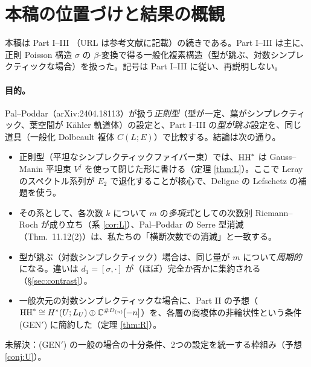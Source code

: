 \section{本稿の位置づけと結果の概観}\label{sec:intro}
本稿は Part I--III \cite{PartI,PartII,PartIII}（URL は参考文献に記載）の続きである。Part I--III は主に、正則 Poisson 構造 $\sigma$ の $\beta$-変換で得る一般化複素構造（型が跳ぶ、対数シンプレクティックな場合）を扱った。記号は Part I--III に従い、再説明しない。

\paragraph{目的。}
Pal--Poddar（arXiv:2404.18113）が扱う\emph{正則型}（型が一定、葉がシンプレクティック、葉空間が Kähler 軌道体）の設定と、Part I--III の\emph{型が跳ぶ}設定を、同じ道具（一般化 Dolbeault 複体 $C(L;E)$）で比較する。結論は次の通り。
\begin{itemize}
\item 正則型（平坦なシンプレクティックファイバー束）では、$\mathrm{HH}^*$ は Gauss--Manin 平坦束 $V^j$ を使って閉じた形に書ける（定理 \ref{thm:L}）\tP。ここで Leray のスペクトル系列が $E_2$ で退化することが核心で、Deligne の Lefschetz の補題を使う。
\item その系として、各次数 $k$ について $m$ の\emph{多項式}としての次数別 Riemann--Roch が成り立ち（系 \ref{cor:L}）、Pal--Poddar の Serre 型消滅（Thm.\ 11.12(2)）は、私たちの「横断次数での消滅」と一致する\tP。
\item 型が跳ぶ（対数シンプレクティック）場合は、同じ量が $m$ について\emph{周期的}になる。違いは $d_1=[\sigma,\cdot]$ が（ほぼ）完全か否かに集約される（\S\ref{sec:contrast}）\tP\tV。
\item 一般次元の対数シンプレクティックな場合に、Part II の予想（$\mathrm{HH}^*\cong H^*(U;L_U)\oplus\mathbb C^{\#D_{(n)}}[-n]$）を、各層の商複体の非輪状性という条件 (GEN$'$) に簡約した（定理 \ref{thm:R}）\tP。
\end{itemize}
未解決：(GEN$'$) の一般の場合の十分条件、2つの設定を統一する枠組み（予想 \ref{conj:U}）。

